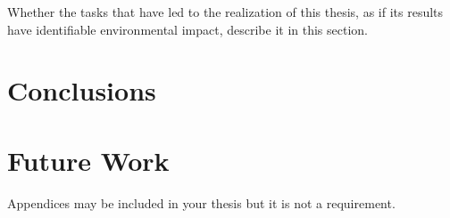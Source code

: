 \documentclass[a4paper,12pt]{article}
\begin{document}
{Whether the tasks that have led to the realization of this thesis, as if its results have identifiable environmental
impact, describe it in this section.}

\clearpage
\section{Conclusions}
\label{sec:conclusions}

\lipsum[4]

\lipsum[3]

\section{Future Work}
\label{sec:futwork}

\lipsum[10]

\newpage

\medskip




\clearpage
\newpage
\begin{appendices}

{Appendices may be included in your thesis but it is not a requirement.}

\end{appendices}
\end{document}
